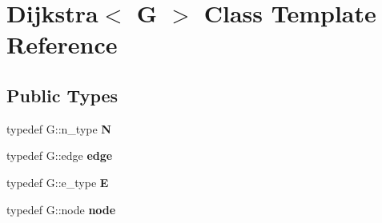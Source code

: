 \hypertarget{classDijkstra}{\section{\-Dijkstra$<$ \-G $>$ \-Class \-Template \-Reference}
\label{classDijkstra}
}
\subsection*{\-Public \-Types}
\begin{DoxyCompactItemize}
\item 
\hypertarget{classDijkstra_ab7f8b6927909a9976c8bad9b7c30c32c}{typedef \-G\-::n\-\_\-type {\bfseries \-N}}\label{classDijkstra_ab7f8b6927909a9976c8bad9b7c30c32c}

\item 
\hypertarget{classDijkstra_a53d45a130eff5a3d5a5b40ec65abbdfa}{typedef \-G\-::edge {\bfseries edge}}\label{classDijkstra_a53d45a130eff5a3d5a5b40ec65abbdfa}

\item 
\hypertarget{classDijkstra_a05f32c112a10d74ecc51ad17d813d279}{typedef \-G\-::e\-\_\-type {\bfseries \-E}}\label{classDijkstra_a05f32c112a10d74ecc51ad17d813d279}

\item 
\hypertarget{classDijkstra_a74cbf219a476e263015cbfb6cd300c27}{typedef \-G\-::node {\bfseries node}}\label{classDijkstra_a74cbf219a476e263015cbfb6cd300c27}

\end{DoxyCompactItemize}
